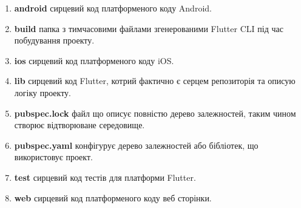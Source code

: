 \begin{enumerate}
    \item \textbf{android} сирцевий код платформеного коду Android.
    \item \textbf{build} папка з тимчасовими файлами згенерованими Flutter CLI під час побудування проекту.
    \item \textbf{ios} сирцевий код платформеного коду iOS.
    \item \textbf{lib} сирцевий код Flutter, котрий фактично є серцем репозиторія та описую логіку проекту.
    \item \textbf{pubspec.lock} файл що описує повністю дерево залежностей, таким чином створює відтворюване середовище.
    \item \textbf{pubspec.yaml} конфігурує дерево залежностей або бібліотек, що використовує проект.
    \item \textbf{test} сирцевий код тестів для платформи Flutter.
    \item \textbf{web} сирцевий код платформеного коду веб сторінки.
\end{enumerate}
